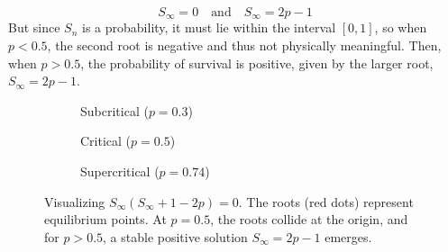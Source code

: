 \documentclass[11pt]{article}
\begin{document}
$$S_\infty = 0 \quad \text{and} \quad S_\infty = 2p - 1$$
But since $S_n$ is a probability, it must lie within the interval $[0,1]$, so when $p < 0.5$, the second root is negative and thus not physically meaningful.
Then, when $p > 0.5$, the probability of survival is positive, given by the larger root, $S_\infty = 2p - 1$. 


\begin{figure}[htbp]
    \centering
    
    \begin{subfigure}[b]{0.325\textwidth}
        \centering
        \caption{Subcritical ($p = 0.3$)}
    \end{subfigure}
    \hfill
    \begin{subfigure}[b]{0.325\textwidth}
        \centering
        \caption{Critical ($p = 0.5$)}
    \end{subfigure}
    \hfill
    \begin{subfigure}[b]{0.325\textwidth}
        \centering
        \caption{Supercritical ($p = 0.74$)}
    \end{subfigure}

    \caption{Visualizing $S_\infty(S_\infty + 1 - 2p) = 0$. The roots (red dots) represent equilibrium points. At $p=0.5$, the roots collide at the origin, and for $p>0.5$, a stable positive solution $S_\infty = 2p-1$ emerges.}
    \label{fig:phase_transition}
\end{figure}
\end{document}
